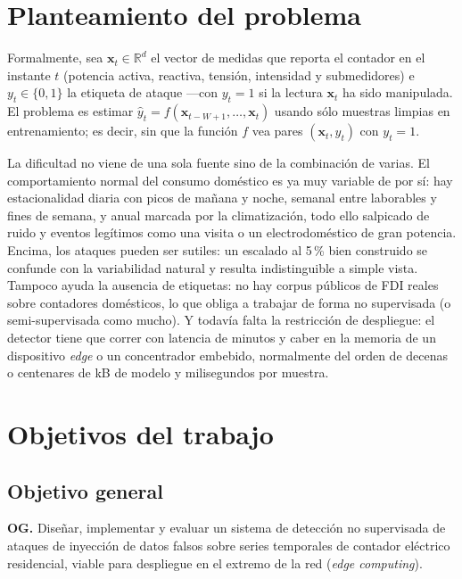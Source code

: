 \section{Planteamiento del problema}
\label{sec:problema}

Formalmente, sea $\bm{x}_t \in \mathbb{R}^d$ el vector de medidas que reporta el contador en el instante $t$ (potencia activa, reactiva, tensión, intensidad y submedidores) e $y_t \in \{0,1\}$ la etiqueta de ataque ---con $y_t=1$ si la lectura $\bm{x}_t$ ha sido manipulada. El problema es estimar $\hat y_t = f(\bm{x}_{t-W+1}, \ldots, \bm{x}_t)$ usando sólo muestras limpias en entrenamiento; es decir, sin que la función $f$ vea pares $(\bm{x}_t, y_t)$ con $y_t=1$.

La dificultad no viene de una sola fuente sino de la combinación de varias. El comportamiento normal del consumo doméstico es ya muy variable de por sí: hay estacionalidad diaria con picos de mañana y noche, semanal entre laborables y fines de semana, y anual marcada por la climatización, todo ello salpicado de ruido y eventos legítimos como una visita o un electrodoméstico de gran potencia. Encima, los ataques pueden ser sutiles: un escalado al 5\,\% bien construido se confunde con la variabilidad natural y resulta indistinguible a simple vista. Tampoco ayuda la ausencia de etiquetas: no hay corpus públicos de FDI reales sobre contadores domésticos, lo que obliga a trabajar de forma no supervisada (o semi-supervisada como mucho). Y todavía falta la restricción de despliegue: el detector tiene que correr con latencia de minutos y caber en la memoria de un dispositivo \textit{edge} o un concentrador embebido, normalmente del orden de decenas o centenares de kB de modelo y milisegundos por muestra.

\section{Objetivos del trabajo}
\label{sec:objetivos}

\subsection*{Objetivo general}

\noindent\textbf{OG.} Diseñar, implementar y evaluar un sistema de detección no supervisada de ataques de inyección de datos falsos sobre series temporales de contador eléctrico residencial, viable para despliegue en el extremo de la red (\textit{edge computing}).

